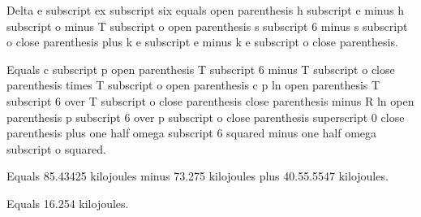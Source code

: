 Delta e subscript ex subscript six equals open parenthesis h subscript e minus h subscript o minus T subscript o open parenthesis s subscript 6 minus s subscript o close parenthesis plus k e subscript e minus k e subscript o close parenthesis.

Equals c subscript p open parenthesis T subscript 6 minus T subscript o close parenthesis times T subscript o open parenthesis c p ln open parenthesis T subscript 6 over T subscript o close parenthesis close parenthesis minus R ln open parenthesis p subscript 6 over p subscript o close parenthesis superscript 0 close parenthesis plus one half omega subscript 6 squared minus one half omega subscript o squared.

Equals 85.43425 kilojoules minus 73.275 kilojoules plus 40.55.5547 kilojoules.

Equals 16.254 kilojoules.